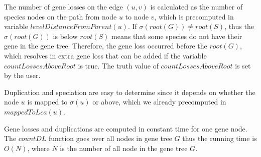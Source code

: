 The number of gene losses on the edge $(u, v)$ is calculated as the number of species nodes on the path from node $u$ to node $v$, which is precomputed in variable $levelDistanceFromParent(u)$. If $\sigma(root(G)) \ne root(S)$, thus the $\sigma(root(G))$ is below $root(S)$ means that some species do not have their gene in the gene tree. Therefore, the gene loss occurred before the $root(G)$, which resolves in extra gene loss that can be added if the variable $countLossesAboveRoot$ is true. The truth value of $countLossesAboveRoot$ is set by the user.

Duplication and speciation are easy to determine since it depends on whether the node $u$ is mapped to $\sigma(u)$ or above, which we already precomputed in $mappedToLca(u)$.

Gene losses and duplications are computed in constant time for one gene node. The $countDL$ function goes over all nodes in gene tree $G$ thus the running time is $O(N)$, where $N$ is the number of all node in the gene tree $G$.



